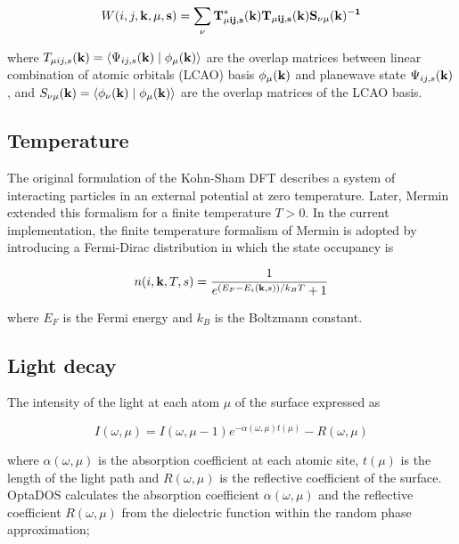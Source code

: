 \documentclass[a4paper,11pt,twoside]{book}
\begin{document}
\begin{equation}
W(i, j,\bf{k}, \mu,s) =\sum_{\nu} T^{*}_{\mu ij,s}({\bf{k}}) T_{\mu ij,s}({\bf{k}}) S_{\nu \mu}(\bf{k})^{-1}
\label{weights}
\end{equation}

where $T_{\mu ij,s}({\bf k}) = \left \langle \Psi_{ij,s}({\bf k}) \mid \phi_{\mu}({\bf k}) \right \rangle$ are the overlap matrices between linear combination of atomic orbitals (LCAO) basis $\phi_{\mu}({\bf k})$ and planewave state $\Psi_{ij,s}({\bf k})$, and $S_{\nu \mu}({\bf k}) = \left \langle \phi_{\nu}({\bf k}) \mid \phi_{\mu}({\bf k}) \right \rangle$ are the overlap matrices of the LCAO basis.

\subsection{Temperature}

The original formulation of the Kohn-Sham DFT describes a system of interacting particles in an external potential at zero temperature. Later, Mermin extended this formalism for a finite temperature $T>0$. In the current implementation, the finite temperature formalism of Mermin is adopted by introducing a Fermi-Dirac distribution in which the state occupancy is

\begin{equation}
n(i,{\bf{k}},T,s) = \frac{1}{e^{(E_{F}-E_i ({\bf{k}},s))/k_BT}+1}
    \label{Fermi_dirac}
\end{equation}

where $E_F$ is the Fermi energy and $k_B$ is the Boltzmann constant.

\subsection{Light decay}

The intensity of the light at each atom $\mu$ of the surface expressed as

\begin{equation}
I(\omega,\mu) = I(\omega, \mu-1)e^{-\alpha(\omega,\mu)t(\mu)}-R(\omega,\mu)
    \label{Intensity}
\end{equation}

where $\alpha(\omega,\mu)$ is the absorption coefficient at each atomic site, $t(\mu)$ is the length of the light path and $R(\omega,\mu)$ is the reflective coefficient of the surface. OptaDOS calculates the absorption coefficient $\alpha(\omega,\mu)$ and the reflective coefficient $R(\omega,\mu)$ from the dielectric function within the random phase approximation;
\end{document}
